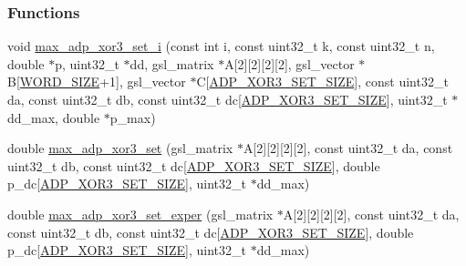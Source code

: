 \subsubsection*{\-Functions}
\begin{DoxyCompactItemize}
\item 
void \hyperlink{max-adp-xor3-set_8hh_a338bdbbb9210c9ed8cc6c053ab42aa68}{max\-\_\-adp\-\_\-xor3\-\_\-set\-\_\-i} (const int i, const uint32\-\_\-t k, const uint32\-\_\-t n, double $\ast$p, uint32\-\_\-t $\ast$dd, gsl\-\_\-matrix $\ast$\-A\mbox{[}2\mbox{]}\mbox{[}2\mbox{]}\mbox{[}2\mbox{]}\mbox{[}2\mbox{]}, gsl\-\_\-vector $\ast$\-B\mbox{[}\hyperlink{common_8hh_a92ed8507d1cd2331ad09275c5c4c1c89}{\-W\-O\-R\-D\-\_\-\-S\-I\-Z\-E}+1\mbox{]}, gsl\-\_\-vector $\ast$\-C\mbox{[}\hyperlink{max-adp-xor3-set_8hh_a6b52658f2068b1daef8ed31dd70ead0c}{\-A\-D\-P\-\_\-\-X\-O\-R3\-\_\-\-S\-E\-T\-\_\-\-S\-I\-Z\-E}\mbox{]}, const uint32\-\_\-t da, const uint32\-\_\-t db, const uint32\-\_\-t dc\mbox{[}\hyperlink{max-adp-xor3-set_8hh_a6b52658f2068b1daef8ed31dd70ead0c}{\-A\-D\-P\-\_\-\-X\-O\-R3\-\_\-\-S\-E\-T\-\_\-\-S\-I\-Z\-E}\mbox{]}, uint32\-\_\-t $\ast$dd\-\_\-max, double $\ast$p\-\_\-max)
\item 
double \hyperlink{max-adp-xor3-set_8hh_a64619e5349dd07dc017b0469b4066fce}{max\-\_\-adp\-\_\-xor3\-\_\-set} (gsl\-\_\-matrix $\ast$\-A\mbox{[}2\mbox{]}\mbox{[}2\mbox{]}\mbox{[}2\mbox{]}\mbox{[}2\mbox{]}, const uint32\-\_\-t da, const uint32\-\_\-t db, const uint32\-\_\-t dc\mbox{[}\hyperlink{max-adp-xor3-set_8hh_a6b52658f2068b1daef8ed31dd70ead0c}{\-A\-D\-P\-\_\-\-X\-O\-R3\-\_\-\-S\-E\-T\-\_\-\-S\-I\-Z\-E}\mbox{]}, double p\-\_\-dc\mbox{[}\hyperlink{max-adp-xor3-set_8hh_a6b52658f2068b1daef8ed31dd70ead0c}{\-A\-D\-P\-\_\-\-X\-O\-R3\-\_\-\-S\-E\-T\-\_\-\-S\-I\-Z\-E}\mbox{]}, uint32\-\_\-t $\ast$dd\-\_\-max)
\item 
double \hyperlink{max-adp-xor3-set_8hh_a0a37e7b1b1aed6c625c2c64f9fc710f6}{max\-\_\-adp\-\_\-xor3\-\_\-set\-\_\-exper} (gsl\-\_\-matrix $\ast$\-A\mbox{[}2\mbox{]}\mbox{[}2\mbox{]}\mbox{[}2\mbox{]}\mbox{[}2\mbox{]}, const uint32\-\_\-t da, const uint32\-\_\-t db, const uint32\-\_\-t dc\mbox{[}\hyperlink{max-adp-xor3-set_8hh_a6b52658f2068b1daef8ed31dd70ead0c}{\-A\-D\-P\-\_\-\-X\-O\-R3\-\_\-\-S\-E\-T\-\_\-\-S\-I\-Z\-E}\mbox{]}, double p\-\_\-dc\mbox{[}\hyperlink{max-adp-xor3-set_8hh_a6b52658f2068b1daef8ed31dd70ead0c}{\-A\-D\-P\-\_\-\-X\-O\-R3\-\_\-\-S\-E\-T\-\_\-\-S\-I\-Z\-E}\mbox{]}, uint32\-\_\-t $\ast$dd\-\_\-max)
\end{DoxyCompactItemize}


